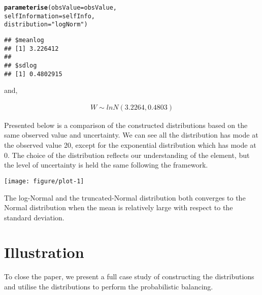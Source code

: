 \documentclass[nojss]{jss}\usepackage[]{graphicx}\usepackage[]{color}
\makeatletter
\def\maxwidth{ %
  \ifdim\Gin@nat@width>\linewidth
    \linewidth
  \else
    \Gin@nat@width
  \fi
}
\newcommand{\hlstr}[1]{\textcolor[rgb]{0.192,0.494,0.8}{#1}}%
\newcommand{\hlstd}[1]{\textcolor[rgb]{0.345,0.345,0.345}{#1}}%
\newcommand{\hlkwc}[1]{\textcolor[rgb]{0.333,0.667,0.333}{#1}}%
\newcommand{\hlkwd}[1]{\textcolor[rgb]{0.737,0.353,0.396}{\textbf{#1}}}%
\newenvironment{kframe}{%
 \def\at@end@of@kframe{}%
 \ifinner\ifhmode%
  \def\at@end@of@kframe{\end{minipage}}%
  \begin{minipage}{\columnwidth}%
 \fi\fi%
 \def\FrameCommand##1{\hskip\@totalleftmargin \hskip-\fboxsep
 \colorbox{shadecolor}{##1}\hskip-\fboxsep
     \hskip-\linewidth \hskip-\@totalleftmargin \hskip\columnwidth}%
 \MakeFramed {\advance\hsize-\width
   \@totalleftmargin\z@ \linewidth\hsize
   \@setminipage}}%
 {\par\unskip\endMakeFramed%
 \at@end@of@kframe}
\newenvironment{knitrout}{}{} %
\makeatother
\begin{document}
\begin{knitrout}
\color{fgcolor}\begin{kframe}
\begin{alltt}
\hlkwd{parameterise}\hlstd{(}\hlkwc{obsValue} \hlstd{= obsValue,}
             \hlkwc{selfInformation} \hlstd{= selfInfo,}
             \hlkwc{distribution} \hlstd{=} \hlstr{"logNorm"}\hlstd{)}
\end{alltt}
\begin{verbatim}
## $meanlog
## [1] 3.226412
## 
## $sdlog
## [1] 0.4802915
\end{verbatim}
\end{kframe}
\end{knitrout}

and,


\begin{align}
  W \sim lnN(3.2264, 
  0.4803)\nonumber
\end{align}


Presented below is a comparison of the constructed distributions based
on the same observed value and uncertainty. We can see all the
distribution has mode at the observed value 20, except
for the exponential distribution which has mode at 0. The choice of
the distribution reflects our understanding of the element, but the
level of uncertainty is held the same following the framework.

\begin{knitrout}
\color{fgcolor}

{\centering \texttt{[image: figure/plot-1]} 

}



\end{knitrout}

The log-Normal and the truncated-Normal distribution both converges to
the Normal distribution when the mean is relatively large with respect
to the standard deviation.
  


\section{Illustration}

To close the paper, we present a full case study of constructing the
distributions and utilise the distributions to perform the
probabilistic balancing.
\end{document}
